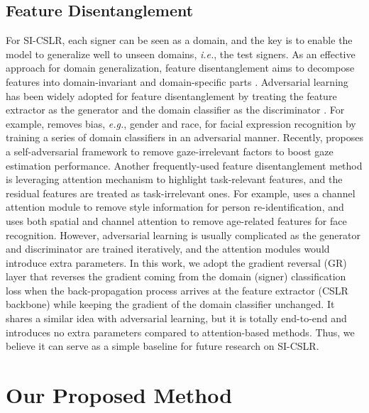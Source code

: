 \documentclass[acmsmall,screen]{acmart}
\def\eg{\emph{e.g.}} \def\Eg{\emph{E.g.}}
\def\ie{\emph{i.e.}} \def\Ie{\emph{I.e.}}
\begin{document}
\subsection{Feature Disentanglement}
\label{sec:disent}
For SI-CSLR, each signer can be seen as a domain, and the key is to enable the model to generalize well to unseen domains, \ie, the test signers.
As an effective approach for domain generalization, feature disentanglement aims to decompose features into domain-invariant and domain-specific parts \cite{wang2021generalizing}.
Adversarial learning has been widely adopted for feature disentanglement by treating the feature extractor as the generator and the domain classifier as the discriminator \cite{xu2020investigating, cheng2021puregaze, liu2018exploring}.
For example, \cite{xu2020investigating} removes bias, \eg, gender and race, for facial expression recognition by training a series of domain classifiers in an adversarial manner.
Recently, \cite{cheng2021puregaze} proposes a self-adversarial framework to remove gaze-irrelevant factors to boost gaze estimation performance.
Another frequently-used feature disentanglement method is leveraging attention mechanism to highlight task-relevant features, and the residual features are treated as task-irrelevant ones.
For example, \cite{jin2020style} uses a channel attention module to remove style information for person re-identification, and \cite{huang2021age} uses both spatial and channel attention to remove age-related features for face recognition.
However, adversarial learning is usually complicated as the generator and discriminator are trained iteratively, and the attention modules would introduce extra parameters.
In this work, we adopt the gradient reversal (GR) layer \cite{ganin2016domain} that reverses the gradient coming from the domain (signer) classification loss when the back-propagation process arrives at the feature extractor (CSLR backbone) while keeping the gradient of the domain classifier unchanged.
It shares a similar idea with adversarial learning, but it is totally end-to-end and introduces no extra parameters compared to attention-based methods.
Thus, we believe it can serve as a simple baseline for future research on SI-CSLR.

 \section{Our Proposed Method}
\end{document}
